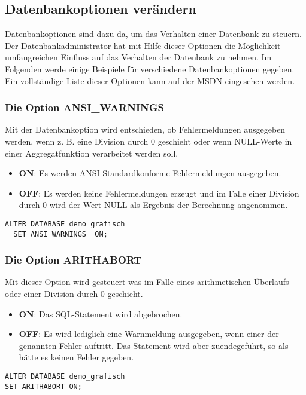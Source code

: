       \subsection{Datenbankoptionen verändern}
        Datenbankoptionen sind dazu da, um das Verhalten einer Datenbank zu
        steuern. Der Datenbankadministrator hat mit Hilfe dieser Optionen die
        Möglichkeit umfangreichen Einfluss auf das Verhalten der Datenbank zu
        nehmen. Im Folgenden werde einige Beispiele für verschiedene
        Datenbankoptionen gegeben. Ein vollständige Liste dieser Optionen kann
        auf der MSDN eingesehen werden.
        \begin{literaturinternet}
          \item \cite{bb522682}
        \end{literaturinternet}
        \subsubsection{Die Option ANSI\_WARNINGS}
          Mit der Datenbankoption  wird entschieden,
          ob Fehlermeldungen ausgegeben werden, wenn z. B. eine Division durch 0
          geschieht oder wenn NULL-Werte in einer Aggregatfunktion verarbeitet
          werden soll.
          \begin{itemize}
              \item \textbf{ON}: Es werden ANSI-Standardkonforme Fehlermeldungen
              ausgegeben.
              \item \textbf{OFF}: Es werden keine Fehlermeldungen erzeugt und im
              Falle einer Division durch 0 wird der Wert NULL als Ergebnis der
              Berechnung angenommen.
          \end{itemize}
          \begin{lstlisting}[language=ms_sql,caption={ANSI-Standardkonforme
            Warnmeldungen ausgeben},label=admin03_15]
  ALTER DATABASE demo_grafisch
  SET ANSI_WARNINGS  ON;
            \end{lstlisting}
        \subsubsection{Die Option ARITHABORT}
          Mit dieser Option wird gesteuert was im Falle eines arithmetischen
          Überlaufs oder einer Division durch 0 geschieht.
\clearpage
          \begin{itemize}
              \item \textbf{ON}: Das SQL-Statement wird abgebrochen.
              \item \textbf{OFF}: Es wird lediglich eine Warnmeldung ausgegeben,
              wenn einer der genannten Fehler auftritt. Das Statement wird aber
              zuendegeführt, so als hätte es keinen Fehler gegeben.
          \end{itemize}
          \begin{lstlisting}[language=ms_sql,caption={Arithmetische
          Überläufe und Divisionen durch 0 kontrollieren},label=admin03_16]
ALTER DATABASE demo_grafisch 
SET ARITHABORT ON;
          \end{lstlisting}
